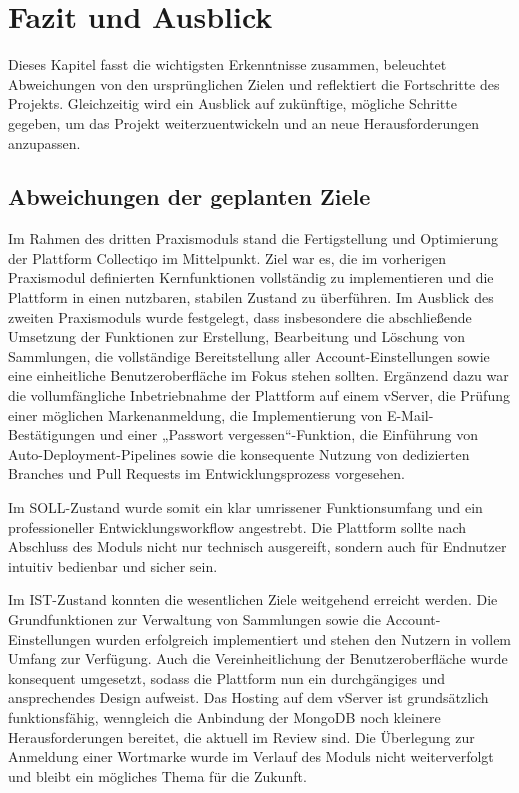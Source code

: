 \section{Fazit und Ausblick}\label{sec:fazit-ausblick}

Dieses Kapitel fasst die wichtigsten Erkenntnisse zusammen, beleuchtet Abweichungen von den ursprünglichen Zielen und reflektiert die Fortschritte des Projekts.
Gleichzeitig wird ein Ausblick auf zukünftige, mögliche Schritte gegeben, um das Projekt weiterzuentwickeln und an neue Herausforderungen anzupassen.

\subsection{Abweichungen der geplanten Ziele}\label{subsec:abweichungen-der-geplanten-ziele}

Im Rahmen des dritten Praxismoduls stand die Fertigstellung und Optimierung der Plattform Collectiqo im Mittelpunkt.
Ziel war es, die im vorherigen Praxismodul definierten Kernfunktionen vollständig zu implementieren und die Plattform in einen nutzbaren, stabilen Zustand zu überführen.
Im Ausblick des zweiten Praxismoduls wurde festgelegt, dass insbesondere die abschließende Umsetzung der Funktionen zur Erstellung, Bearbeitung und Löschung von Sammlungen, die vollständige Bereitstellung aller Account-Einstellungen sowie eine einheitliche Benutzeroberfläche im Fokus stehen sollten.
Ergänzend dazu war die vollumfängliche Inbetriebnahme der Plattform auf einem vServer, die Prüfung einer möglichen Markenanmeldung, die Implementierung von E-Mail-Bestätigungen und einer „Passwort vergessen“-Funktion, die Einführung von Auto-Deployment-Pipelines sowie die konsequente Nutzung von dedizierten Branches und Pull Requests im Entwicklungsprozess vorgesehen.

Im SOLL-Zustand wurde somit ein klar umrissener Funktionsumfang und ein professioneller Entwicklungsworkflow angestrebt.
Die Plattform sollte nach Abschluss des Moduls nicht nur technisch ausgereift, sondern auch für Endnutzer intuitiv bedienbar und sicher sein.

Im IST-Zustand konnten die wesentlichen Ziele weitgehend erreicht werden.
Die Grundfunktionen zur Verwaltung von Sammlungen sowie die Account-Einstellungen wurden erfolgreich implementiert und stehen den Nutzern in vollem Umfang zur Verfügung.
Auch die Vereinheitlichung der Benutzeroberfläche wurde konsequent umgesetzt, sodass die Plattform nun ein durchgängiges und ansprechendes Design aufweist.
Das Hosting auf dem vServer ist grundsätzlich funktionsfähig, wenngleich die Anbindung der MongoDB noch kleinere Herausforderungen bereitet, die aktuell im Review sind.
Die Überlegung zur Anmeldung einer Wortmarke wurde im Verlauf des Moduls nicht weiterverfolgt und bleibt ein mögliches Thema für die Zukunft.

